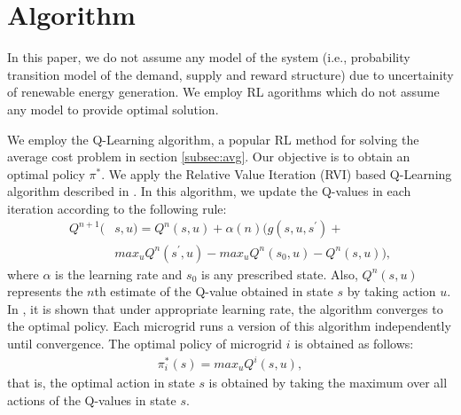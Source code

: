 \section{Algorithm}\label{sec:algo}


 In this paper, we do not assume any model of the system (i.e., probability transition model of the demand, supply and reward structure) due to uncertainity of renewable energy generation. We employ RL agorithms which do not assume any model to provide optimal solution.

We employ the Q-Learning algorithm, a  popular RL method for solving the average cost problem in section \ref{subsec:avg}.
 Our objective is to obtain an optimal policy $\pi^{*}$.
We apply the Relative Value Iteration (RVI) based Q-Learning algorithm described in \cite{avgcost}. In this algorithm, we update the Q-values in each iteration according to the following rule:
\begin{align}
Q^{n+1}(&s,u) = Q^{n}(s,u) + \alpha(n)(g(s,u,s^{'}) + \nonumber\\ &  max_{u} Q^{n}(s^{'},u) - max_{u} Q^{n}(s_{0},u) - Q^{n}(s,u)),
\end{align}
where $\alpha$ is the learning rate and $s_{0}$ is any prescribed state.
Also, $Q^n(s,u)$ represents the $n$th estimate of the Q-value  obtained in state $s$ by taking action $u$. In \cite{avgcost}, it is shown that under appropriate learning rate, the algorithm converges to the  optimal policy. 
Each microgrid runs a version of this algorithm independently until convergence. The optimal policy of microgrid $i$ is obtained as follows:
\begin{align}
\pi_{i}^{*}(s) = max_{u}Q^{i}(s,u),
\end{align}
that is, the optimal action in state $s$ is obtained by taking the maximum over all actions of the Q-values in state $s$.  

